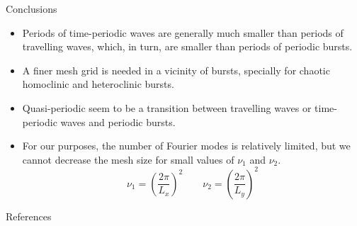 \documentclass{beamer} %
\begin{document}
\begin{frame}{Conclusions}
  \begin{itemize}
    \item Periods of time-periodic waves are generally much smaller than periods of travelling waves, which, in turn, are smaller than periods of periodic bursts.
    \item A finer mesh grid is needed in a vicinity of bursts, specially for chaotic homoclinic and heteroclinic bursts.
    \item Quasi-periodic seem to be a transition between travelling waves or time-periodic waves and periodic bursts.
    \item For our purposes, the number of Fourier modes is relatively limited, but we cannot decrease the mesh size for small values of $\nu_1$ and $\nu_2$.
          \begin{equation*}
            \nu_1={\left(\frac{2\pi}{L_x}\right)}^2\qquad\nu_2={\left(\frac{2\pi}{L_y}\right)}^2
          \end{equation*}
  \end{itemize}
\end{frame}
\begin{frame}[noframenumbering]{References}
  \printbibliography[heading=none]
\end{frame}
\end{document}
